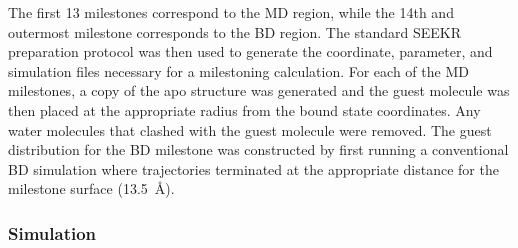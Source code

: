 \par The first 13 milestones correspond to the MD region, while the 14th and
outermost milestone corresponds to the BD region. The standard SEEKR preparation
protocol\cite{Votapka2017} was then used to generate the coordinate, parameter,
and simulation files necessary for a milestoning calculation. For each of the MD
milestones, a copy of the apo \bcd structure was generated and the guest
molecule was then placed at the appropriate radius from the bound state coordinates.
Any water molecules that clashed with the guest molecule were removed. The guest
distribution for the BD milestone was constructed by first running a conventional
BD simulation where trajectories terminated at the appropriate distance for the
milestone surface (13.5~\AA).

\subsubsection{Simulation}
